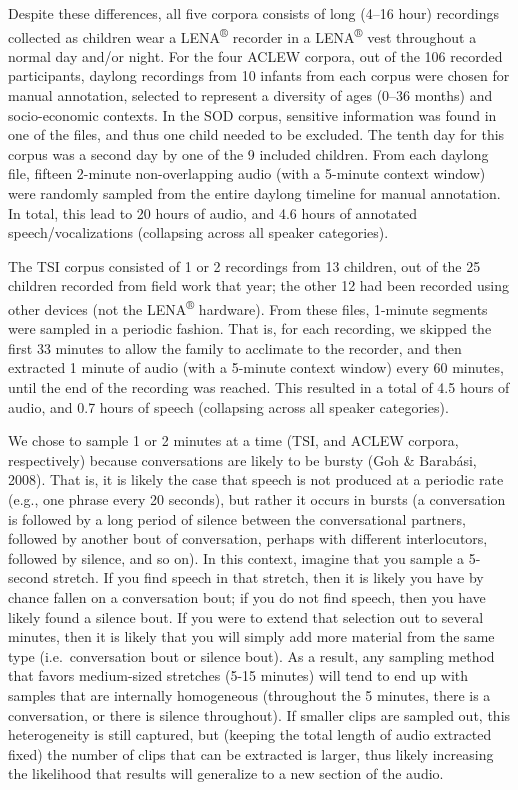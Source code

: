 \documentclass[english,table,man,floatsintext]{apa6}
\begin{document}
Despite these differences, all five corpora consists of long (4--16 hour) recordings collected as children wear a LENA\textsuperscript{®} recorder in a LENA\textsuperscript{®} vest throughout a normal day and/or night. For the four ACLEW corpora, out of the 106 recorded participants, daylong recordings from 10 infants from each corpus were chosen for manual annotation, selected to represent a diversity of ages (0--36 months) and socio-economic contexts. In the SOD corpus, sensitive information was found in one of the files, and thus one child needed to be excluded. The tenth day for this corpus was a second day by one of the 9 included children. From each daylong file, fifteen 2-minute non-overlapping audio (with a 5-minute context window) were randomly sampled from the entire daylong timeline for manual annotation. In total, this lead to 20 hours of audio, and 4.6 hours of annotated speech/vocalizations (collapsing across all speaker categories).

The TSI corpus consisted of 1 or 2 recordings from 13 children, out of the 25 children recorded from field work that year; the other 12 had been recorded using other devices (not the LENA\textsuperscript{®} hardware). From these files, 1-minute segments were sampled in a periodic fashion. That is, for each recording, we skipped the first 33 minutes to allow the family to acclimate to the recorder, and then extracted 1 minute of audio (with a 5-minute context window) every 60 minutes, until the end of the recording was reached. This resulted in a total of 4.5 hours of audio, and 0.7 hours of speech (collapsing across all speaker categories).

We chose to sample 1 or 2 minutes at a time (TSI, and ACLEW corpora, respectively) because conversations are likely to be bursty (Goh \& Barabási, 2008). That is, it is likely the case that speech is not produced at a periodic rate (e.g., one phrase every 20 seconds), but rather it occurs in bursts (a conversation is followed by a long period of silence between the conversational partners, followed by another bout of conversation, perhaps with different interlocutors, followed by silence, and so on). In this context, imagine that you sample a 5-second stretch. If you find speech in that stretch, then it is likely you have by chance fallen on a conversation bout; if you do not find speech, then you have likely found a silence bout. If you were to extend that selection out to several minutes, then it is likely that you will simply add more material from the same type (i.e.~conversation bout or silence bout). As a result, any sampling method that favors medium-sized stretches (5-15 minutes) will tend to end up with samples that are internally homogeneous (throughout the 5 minutes, there is a conversation, or there is silence throughout). If smaller clips are sampled out, this heterogeneity is still captured, but (keeping the total length of audio extracted fixed) the number of clips that can be extracted is larger, thus likely increasing the likelihood that results will generalize to a new section of the audio.
\end{document}
